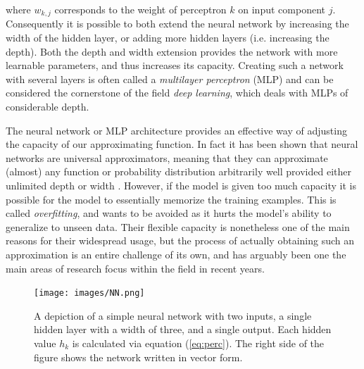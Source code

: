 \documentclass{report}
\begin{document}
where $w_{k,j}$ corresponds to the weight of perceptron $k$ on input component $j$. Consequently it is possible to both extend the neural network by increasing the width of the hidden layer, or adding more hidden layers (i.e. increasing the depth). Both the depth and width extension provides the network with more learnable parameters, and thus increases its capacity. Creating such a network with several layers is often called a \textit{multilayer perceptron} (MLP) and can be considered the cornerstone of the field \textit{deep learning}, which deals with MLPs of considerable depth.

The neural network or MLP architecture provides an effective way of adjusting the capacity of our approximating function. In fact it has been shown that neural networks are universal approximators, meaning that they can approximate (almost) any function or probability distribution arbitrarily well provided either unlimited depth or width \cite{hornik1989multilayer, lu2020universal}. However, if the model is given too much capacity it is possible for the model to essentially memorize the training examples. This is called \textit{overfitting}, and wants to be avoided as it hurts the model's ability to generalize to unseen data. Their flexible capacity is nonetheless one of the main reasons for their widespread usage, but the process of actually obtaining such an approximation is an entire challenge of its own, and has arguably been one the main areas of research focus within the field in recent years.

\begin{figure}[H]
    \centering
    \texttt{[image: images/NN.png]}
    \caption{\onehalfspacing A depiction of a simple neural network with two inputs, a single hidden layer with a width of three, and a single output. Each hidden value $h_k$ is calculated via equation (\ref{eq:perc}). The right side of the figure shows the network written in vector form.}
    \label{fig:NN}
\end{figure}
\end{document}
